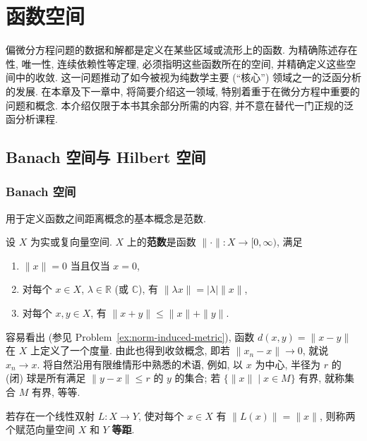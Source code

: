 \section{函数空间}\label{chap:function-spaces}

偏微分方程问题的数据和解都是定义在某些区域或流形上的函数. 为精确陈述存在性, 唯一性, 连续依赖性等定理, 必须指明这些函数所在的空间, 并精确定义这些空间中的收敛. 这一问题推动了如今被视为纯数学主要 (``核心'') 领域之一的泛函分析的发展. 在本章及下一章中, 将简要介绍这一领域, 特别着重于在微分方程中重要的问题和概念. 本介绍仅限于本书其余部分所需的内容, 并不意在替代一门正规的泛函分析课程.

\subsection{Banach 空间与 Hilbert 空间}\label{sec:banach-hilbert-spaces}

\subsubsection{Banach 空间}\label{subsec:banach-spaces}

用于定义函数之间距离概念的基本概念是范数.

\begin{Definition}
\label{def:normed-vector-space-norm}
设 $X$ 为实或复向量空间. $X$ 上的\textbf{范数}是函数 $\|\cdot\|:X\to[0,\infty)$, 满足\begin{enumerate}
\item $\|x\|=0$ 当且仅当 $x=0$,
\item 对每个 $x\in X$, $\lambda\in\mathbb{R}$ (或 $\mathbb{C}$), 有 $\|\lambda x\|=|\lambda|\|x\|$,
\item 对每个 $x,y\in X$, 有 $\|x+y\|\leq\|x\|+\|y\|$.
\end{enumerate}
\end{Definition}

容易看出 (参见 Problem~\ref{ex:norm-induced-metric}), 函数 $d(x,y)=\|x-y\|$ 在 $X$ 上定义了一个度量. 由此也得到收敛概念, 即若 $\|x_n-x\|\to0$, 就说 $x_n\to x$. 将自然沿用有限维情形中熟悉的术语, 例如, 以 $x$ 为中心, 半径为 $r$ 的 (闭) 球是所有满足 $\|y-x\|\leq r$ 的 $y$ 的集合; 若 $\{\|x\|\mid x\in M\}$ 有界, 就称集合 $M$ 有界, 等等.

\begin{Definition}
\label{def:normed-vector-spaces-isometry}
若存在一个线性双射 $L:X\to Y$, 使对每个 $x\in X$ 有 $\|L(x)\|=\|x\|$, 则称两个赋范向量空间 $X$ 和 $Y$ \textbf{等距}.
\end{Definition}

